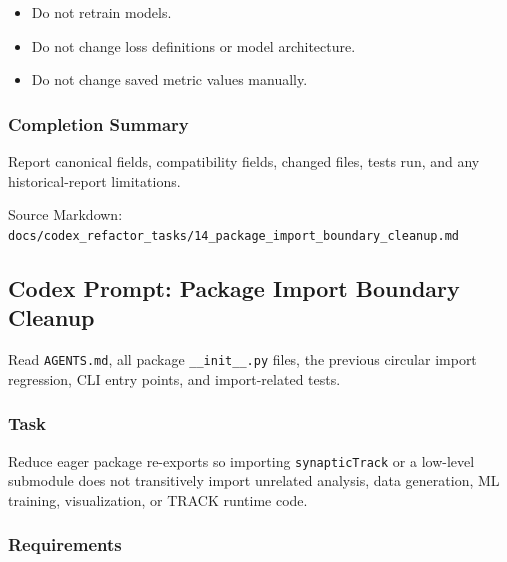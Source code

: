 \documentclass[
]{article}
\providecommand{\tightlist}{%
  \setlength{\itemsep}{0pt}\setlength{\parskip}{0pt}}
\begin{document}
\begin{itemize}
\tightlist
\item
  Do not retrain models.
\item
  Do not change loss definitions or model architecture.
\item
  Do not change saved metric values manually.
\end{itemize}

\hypertarget{completion-summary-2}{%
\subsubsection{Completion Summary}\label{completion-summary-2}}

Report canonical fields, compatibility fields, changed files, tests run,
and any historical-report limitations.

Source Markdown:
\texttt{docs/codex\_refactor\_tasks/14\_package\_import\_boundary\_cleanup.md}

\hypertarget{codex-prompt-package-import-boundary-cleanup}{%
\subsection{Codex Prompt: Package Import Boundary
Cleanup}\label{codex-prompt-package-import-boundary-cleanup}}

Read \texttt{AGENTS.md}, all package \texttt{\_\_init\_\_.py} files, the
previous circular import regression, CLI entry points, and
import-related tests.

\hypertarget{task-13}{%
\subsubsection{Task}\label{task-13}}

Reduce eager package re-exports so importing \texttt{synapticTrack} or a
low-level submodule does not transitively import unrelated analysis,
data generation, ML training, visualization, or TRACK runtime code.

\hypertarget{requirements-13}{%
\subsubsection{Requirements}\label{requirements-13}}
\end{document}
